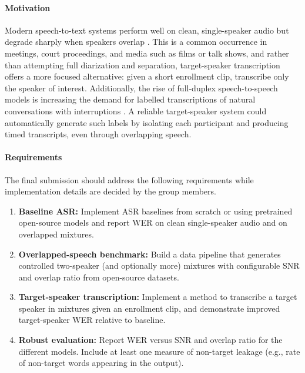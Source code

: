 \documentclass[11pt,a4paper,BCOR12mm, headexclude, footexclude, openright]{scrartcl}
\numberwithin{equation}{section}
\numberwithin{figure}{section}
\numberwithin{table}{section}
\begin{document}
\paragraph*{Motivation}
Modern speech-to-text systems perform well on clean, single-speaker audio but degrade sharply when speakers overlap \cite{Chime} \cite{overlap}. This is a common occurrence in meetings, court proceedings, and media such as films or talk shows, and rather than attempting full diarization and separation, target-speaker transcription offers a more focused alternative: given a short enrollment clip, transcribe only the speaker of interest. Additionally, the rise of full-duplex speech-to-speech models is increasing the demand for labelled transcriptions of natural conversations with interruptions \cite{Moshi, PersonaPlex}. A reliable target-speaker system could automatically generate such labels by isolating each participant and producing timed transcripts, even through overlapping speech.

\paragraph*{Requirements}
The final submission should address the following requirements while implementation details are decided by the group members.
\begin{enumerate}
    \item \textbf{Baseline ASR:} Implement ASR baselines from scratch or using pretrained open-source models and report WER on clean single-speaker audio and on overlapped mixtures.
    \item \textbf{Overlapped-speech benchmark:} Build a data pipeline that generates controlled two-speaker (and optionally more) mixtures with configurable SNR and overlap ratio from open-source datasets.
    \item \textbf{Target-speaker transcription:} Implement a method to transcribe a target speaker in mixtures given an enrollment clip, and demonstrate improved target-speaker WER relative to baseline.
    \item \textbf{Robust evaluation:} Report WER versus SNR and overlap ratio for the different models. Include at least one measure of non-target leakage (e.g., rate of non-target words appearing in the output).
\end{enumerate}
\end{document}
